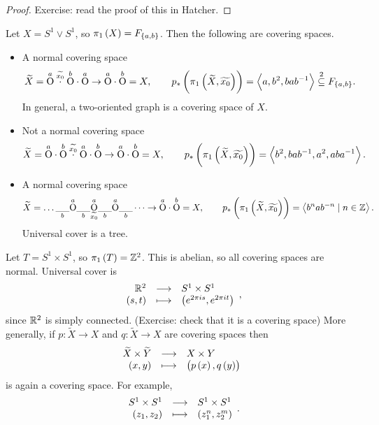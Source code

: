 \begin{proof}
Exercise: read the proof of this in Hatcher.
\end{proof}

\begin{example*}
Let $ X = S^1 \vee S^1 $, so $ \pi_1\br{X} = F_{\cbr{a, b}} $. Then the following are covering spaces.
\begin{itemize}
\item A normal covering space
$$ \widetilde{X} = \overset{a}{\text{O}} \overset{\widetilde{x_0}}{\cdot} \overset{b}{\text{O}} \cdot \overset{a}{\text{O}} \to \overset{a}{\text{O}} \cdot \overset{b}{\text{O}} = X, \qquad p_*\br{\pi_1\br{\widetilde{X}, \widetilde{x_0}}} = \abr{a, b^2, bab^{-1}} \overset{2}{\subseteq} F_{\cbr{a, b}}. $$
In general, a two-oriented graph is a covering space of $ X $.
\item Not a normal covering space
$$ \widetilde{X} = \overset{a}{\text{O}} \cdot \overset{b}{\text{O}} \overset{\widetilde{x_0}}{\cdot} \overset{a}{\text{O}} \cdot \overset{b}{\text{O}} \to \overset{a}{\text{O}} \cdot \overset{b}{\text{O}} = X, \qquad p_*\br{\pi_1\br{\widetilde{X}, \widetilde{x_0}}} = \abr{b^2, bab^{-1}, a^2, aba^{-1}}. $$
\item A normal covering space
$$ \widetilde{X} = \dots \underset{b}{\_\_} \overset{a}{\text{O}} \underset{b}{\_\_} \underset{\widetilde{x_0}}{\overset{a}{\text{O}}} \underset{b}{\_\_} \overset{a}{\text{O}} \underset{b}{\_\_} \dots \to \overset{a}{\text{O}} \cdot \overset{b}{\text{O}} = X, \qquad p_*\br{\pi_1\br{\widetilde{X}, \widetilde{x_0}}} = \abr{b^nab^{-n} \mid n \in \Z}. $$
Universal cover is a tree.
\end{itemize}
\end{example*}

\pagebreak

\begin{example*}
Let $ T = S^1 \times S^1 $, so $ \pi_1\br{T} = \Z^2 $. This is abelian, so all covering spaces are normal. Universal cover is
$$ \function{\R^2}{S^1 \times S^1}{\br{s, t}}{\br{e^{2\pi is}, e^{2\pi it}}}, $$
since $ \mathbb{R}^2 $ is simply connected. (Exercise: check that it is a covering space) More generally, if $ p : \widetilde{X} \to X $ and $ q : \widetilde{X} \to X $ are covering spaces then
$$ \function{\widetilde{X} \times \widetilde{Y}}{X \times Y}{\br{x, y}}{\br{p\br{x}, q\br{y}}} $$
is again a covering space. For example,
$$ \function{S^1 \times S^1}{S^1 \times S^1}{\br{z_1, z_2}}{\br{z_1^n, z_2^m}}. $$
\end{example*}

